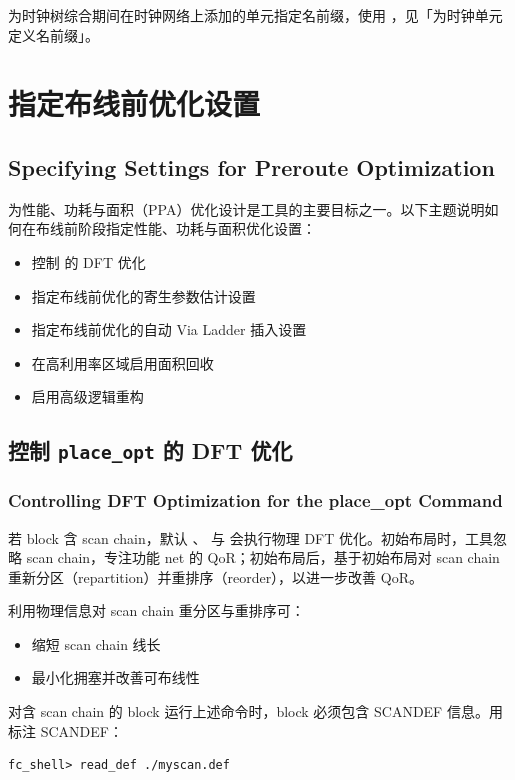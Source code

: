 为时钟树综合期间在时钟网络上添加的单元指定名前缀，使用 ，见「为时钟单元定义名前缀」。

\section{指定布线前优化设置}
\subsection*{Specifying Settings for Preroute Optimization}

为性能、功耗与面积（PPA）优化设计是工具的主要目标之一。以下主题说明如何在布线前阶段指定性能、功耗与面积优化设置：
\begin{itemize}
  \item 控制  的 DFT 优化
  \item 指定布线前优化的寄生参数估计设置
  \item 指定布线前优化的自动 Via Ladder 插入设置
  \item 在高利用率区域启用面积回收
  \item 启用高级逻辑重构
\end{itemize}

\subsection{控制 \texttt{place\_opt} 的 DFT 优化}
\subsubsection*{Controlling DFT Optimization for the place\_opt Command}

若 block 含 scan chain，默认 、 与  会执行物理 DFT 优化。初始布局时，工具忽略 scan chain，专注功能 net 的 QoR；初始布局后，基于初始布局对 scan chain 重新分区（repartition）并重排序（reorder），以进一步改善 QoR。

利用物理信息对 scan chain 重分区与重排序可：
\begin{itemize}
  \item 缩短 scan chain 线长
  \item 最小化拥塞并改善可布线性
\end{itemize}

对含 scan chain 的 block 运行上述命令时，block 必须包含 SCANDEF 信息。用  标注 SCANDEF：
\begin{lstlisting}
fc_shell> read_def ./myscan.def
\end{lstlisting}

